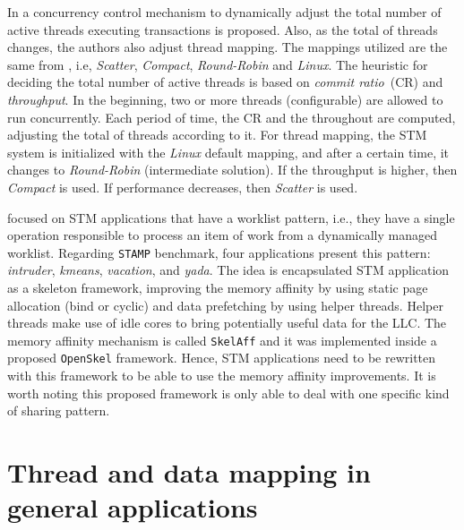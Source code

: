 In  a concurrency control mechanism to dynamically adjust the total number of active threads executing transactions is proposed. Also, as the total of threads changes, the authors also adjust thread mapping. The mappings utilized are the same from , i.e, \emph{Scatter}, \emph{Compact}, \emph{Round-Robin} and \emph{Linux}. The heuristic for deciding the total number of active threads is based on \emph{commit ratio}~(CR) and \emph{throughput}. In the beginning, two or more threads (configurable) are allowed to run concurrently. Each period of time, the CR and the throughout are computed, adjusting the total of threads according to it. For thread mapping, the STM system is initialized with the \emph{Linux} default mapping, and after a certain time, it changes to \emph{Round-Robin} (intermediate solution). If the throughput is higher, then \emph{Compact} is used. If performance decreases, then \emph{Scatter} is used. 

 focused on STM applications that have a worklist pattern, i.e., they have a single operation responsible to process an item of work from a dynamically managed worklist. Regarding \texttt{STAMP} benchmark, four applications present this pattern: \emph{intruder}, \emph{kmeans}, \emph{vacation}, and \emph{yada}. The idea is encapsulated STM application as a skeleton framework, improving the memory affinity by using static page allocation (bind or cyclic) and data prefetching by using helper threads. Helper threads make use of idle cores to bring potentially useful data for the LLC. The memory affinity mechanism is called \texttt{SkelAff} and it was implemented inside a proposed \texttt{OpenSkel} framework. Hence, STM applications need to be rewritten with this framework to be able to use the memory affinity improvements. It is worth noting this proposed framework is only able to deal with one specific kind of sharing pattern.

\section{Thread and data mapping in general applications}\label{sect:ThreadDataRelated}

